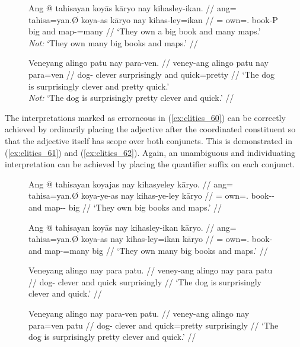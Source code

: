 \begin{figure}[h]
\pex\label{ex:clitics_60}
\a\label{ex:clitics_60a}\begingl
	\gla Ang @ tahisayan koyās kāryo nay kihasley-ikan. //
	\glb ang= tahisa=yan.Ø koya-as kāryo nay kihas-ley=ikan //
	\glc \AgtT{}= own=\TplM{}.\Top{} book-P big and map-\PargI{}=many //
	\glft `They own a big book and many maps.' \\
		\textit{Not:} `They own many big books and maps.' //
\endgl

\a\label{ex:clitics_60b}\begingl
	\gla Veneyang alingo patu nay para-ven. //
	\glb veney-ang alingo patu nay para=ven //
	\glc dog-\Aarg{} clever surprisingly and quick=pretty //
	\glft `The dog is surprisingly clever and pretty quick.' \\
		\textit{Not:} `The dog is surprisingly pretty clever and quick.' //
\endgl
\xe
\end{figure}

The interpretations marked as errorneous in (\ref{ex:clitics_60}) can be
correctly achieved by ordinarily placing the adjective after the coordinated
constituent so that the adjective itself has scope over both conjuncts. This is
demonstrated in (\ref{ex:clitics_61}) and (\ref{ex:clitics_62}). Again, an
unambiguous and individuating interpretation can be achieved by placing the
quantifier suffix on each conjunct.

\begin{figure}
\pex\label{ex:clitics_61}
\a\label{ex:clitics_61a}\begingl
	\gla Ang @ tahisayan koyajas nay kihasyeley kāryo. //
	\glb ang= tahisa=yan.Ø koya-ye-as nay kihas-ye-ley kāryo //
	\glc \AgtT{}= own=\TplM{}.\Top{} book-\Pl{}-\Parg{} and map-\Pl{}-\PargI{}
		big //
	\glft `They own big books and maps.' //
\endgl

\a\label{ex:clitics_61b}\begingl
	\gla Ang @ tahisayan koyās nay kihasley-ikan kāryo. //
	\glb ang= tahisa=yan.Ø koya-as nay kihas-ley=ikan kāryo //
	\glc \AgtT{}= own=\TplM{}.\Top{} book-\Parg{} and map-\PargI{}=many 
		big //
	\glft `They own many big books and maps.' //
\endgl
\xe
\end{figure}

\begin{figure}[h]
\pex\label{ex:clitics_62}
\a\label{ex:clitics_62a}\begingl
	\gla Veneyang alingo nay para patu. //
	\glb veney-ang alingo nay para patu //
	\glc dog-\Aarg{} clever and quick surprisingly //
	\glft `The dog is surprisingly clever and quick.' //
\endgl

\a\label{ex:clitics_62b}\begingl
	\gla Veneyang alingo nay para-ven patu. //
	\glb veney-ang alingo nay para=ven patu //
	\glc dog-\Aarg{} clever and quick=pretty surprisingly //
	\glft `The dog is surprisingly pretty clever and quick.' //
\endgl
\xe
\end{figure}

